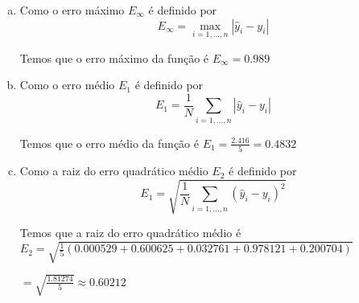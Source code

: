 \documentclass[11pt]{article}
\begin{document}
\newpage

\begin{exerc}
\begin{enumerate}[a.]
Calculando o valor de $f(x)$ para os valores da tabela:

$$
\begin{tabular}{|c|c|c|c|c|c|}
\hline
	x & 0 & 1 & 2 & 3 & 4\\
\hline
	f(x) & 0.5 & 2.5 & 4.5 & 6.5 & 8.5\\
\hline
\end{tabular}
$$

E a tabela de diferenças entre a tabela dada pelo problema e a tabela criada a partir da função

$$
\begin{tabular}{|c|c|c|c|c|c|}
\hline
	x & 0 & 1 & 2 & 3 & 4\\
\hline
	f(x) & 0.023 & 0.775 & -0.181 & -0.989 & -0.448\\
\hline
\end{tabular}
$$

\item
Como o erro máximo $E_\infty$ é definido por
$$E_\infty = \max_{i=1,...,n} |\hat{y}_i - y_i|$$

Temos que o erro máximo da função é $E_\infty = 0.989$

\item
Como o erro médio $E_1$ é definido por
$$E_1 = \frac{1}{N} \sum_{i=1,...,n} |\hat{y}_i - y_i|$$

Temos que o erro médio da função é $E_1 = \frac{2.416}{5} = 0.4832$

\item
Como a raiz do erro quadrático médio $E_2$ é definido por
$$E_1 = \sqrt{\frac{1}{N} \sum_{i=1,...,n} (\hat{y}_i - y_i)^2}$$

Temos que a raiz do erro quadrático médio é $E_2 = \sqrt{\frac{1}{5}(0.000529 + 0.600625 + 0.032761 + 0.978121 + 0.200704)}$

$ = \sqrt{\frac{1.81274}{5}} \approx 0.60212$

\end{enumerate}
\end{exerc}
\end{document}
